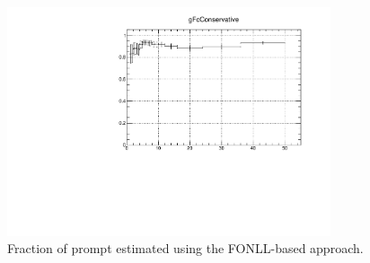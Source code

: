 
\begin{figure}[!b]
\begin{center}
 \includegraphics[width=0.85\textwidth]{figures/Dstar/pp13TeV/feed-down-syst-Dstar.pdf}
\caption{Fraction of prompt \Dstar estimated using the FONLL-based approach.}
\label{fig:Dstarfeeddown_cent}
\end{center}
\end{figure}

